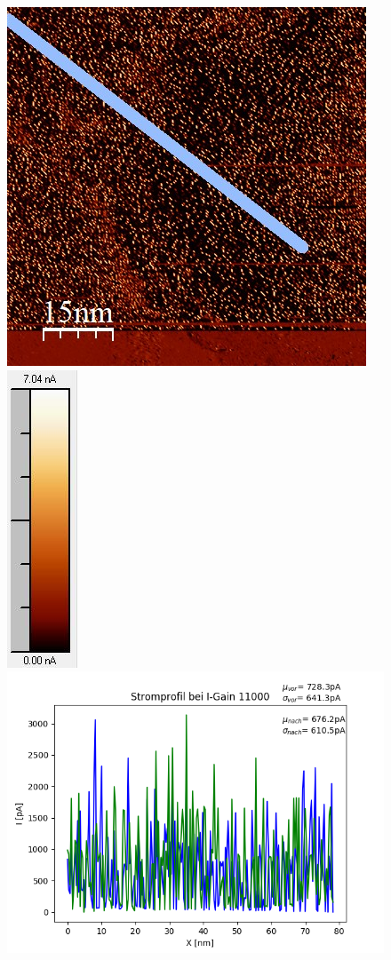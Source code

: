 \documentclass[12pt,a4paper]{article}
\begin{document}
\begin{figure}[H]
\includegraphics[scale=0.6]{Bilder/Anhang/IGain/Strom/11000_IGain_Strom_nach.jpg}
\includegraphics[scale=0.6]{Bilder/Anhang/IGain/Strom/11000_IGain_Strom_nach_Skala.jpg}
\includegraphics[scale=0.5]{Bilder/Anhang/IGain/Strom/Strom_Profil_IGain_11000.png}

\end{figure}
\end{document}
